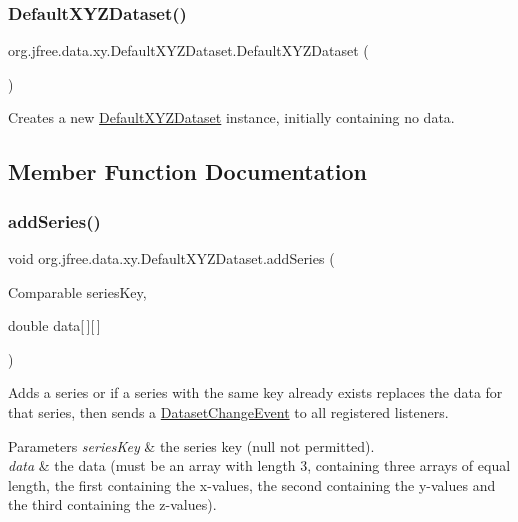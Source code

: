 \subsubsection{\texorpdfstring{Default\+X\+Y\+Z\+Dataset()}{DefaultXYZDataset()}}
{\footnotesize\ttfamily org.\+jfree.\+data.\+xy.\+Default\+X\+Y\+Z\+Dataset.\+Default\+X\+Y\+Z\+Dataset (\begin{DoxyParamCaption}{ }\end{DoxyParamCaption})}

Creates a new {\ttfamily \mbox{\hyperlink{classorg_1_1jfree_1_1data_1_1xy_1_1_default_x_y_z_dataset}{Default\+X\+Y\+Z\+Dataset}}} instance, initially containing no data. 

\subsection{Member Function Documentation}
\mbox{\label{classorg_1_1jfree_1_1data_1_1xy_1_1_default_x_y_z_dataset_a356c3817c9194153f765222f75a6d5e4}} 
\subsubsection{\texorpdfstring{add\+Series()}{addSeries()}}
{\footnotesize\ttfamily void org.\+jfree.\+data.\+xy.\+Default\+X\+Y\+Z\+Dataset.\+add\+Series (\begin{DoxyParamCaption}\item[{Comparable}]{series\+Key,  }\item[{double}]{data\mbox{[}$\,$\mbox{]}\mbox{[}$\,$\mbox{]} }\end{DoxyParamCaption})}

Adds a series or if a series with the same key already exists replaces the data for that series, then sends a \mbox{\hyperlink{}{Dataset\+Change\+Event}} to all registered listeners.


\begin{DoxyParams}{Parameters}
{\em series\+Key} & the series key ({\ttfamily null} not permitted). \\
\hline
{\em data} & the data (must be an array with length 3, containing three arrays of equal length, the first containing the x-\/values, the second containing the y-\/values and the third containing the z-\/values). \\
\hline
\end{DoxyParams}
\mbox{\label{classorg_1_1jfree_1_1data_1_1xy_1_1_default_x_y_z_dataset_ad5d91fe2bbdc63a70b5e597afd309189}} 
